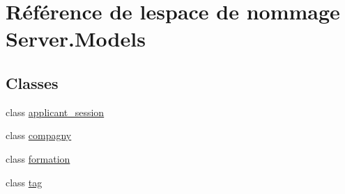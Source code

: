 \hypertarget{namespace_server_1_1_models}{}\section{Référence de l\textquotesingle{}espace de nommage Server.\+Models}
\label{namespace_server_1_1_models}
\subsection*{Classes}
\begin{DoxyCompactItemize}
\item 
class \hyperlink{class_server_1_1_models_1_1applicant__session}{applicant\+\_\+session}
\item 
class \hyperlink{class_server_1_1_models_1_1compagny}{compagny}
\item 
class \hyperlink{class_server_1_1_models_1_1formation}{formation}
\item 
class \hyperlink{class_server_1_1_models_1_1tag}{tag}
\end{DoxyCompactItemize}
